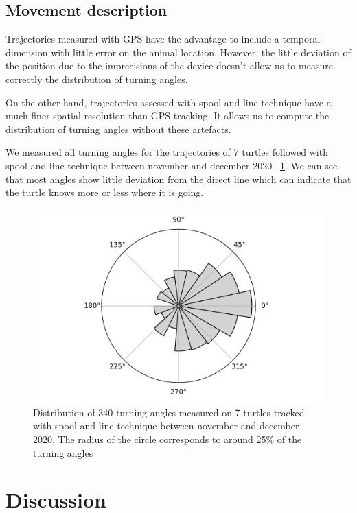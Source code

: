 \documentclass[10pt]{article}
\begin{document}
\subsection*{Movement description}

Trajectories measured with GPS have the advantage to include a temporal dimension with little error on the animal location. However, the little deviation of the position due to the imprecisions of the device doesn't allow us to measure correctly the distribution of turning angles.

On the other hand, trajectories assessed with spool and line technique have a much finer spatial resolution than GPS tracking. It allows us to compute the distribution of turning angles without these artefacts.

We measured all turning angles for the trajectories of 7 turtles followed with spool and line technique between november and december 2020 ~\ref{fig:angles}. We can see that most angles show little deviation from the direct line which can indicate that the turtle knows more or less where it is going.

\begin{figure}[!ht]
\centering
\includegraphics[width=0.9\columnwidth]{radial_histograms.png}
\caption{Distribution of 340 turning angles measured on 7 turtles tracked with spool and line technique between november and december 2020. The radius of the circle corresponds to around 25\% of the turning angles }
\label{fig:angles}
\end{figure}

\section*{Discussion}
\end{document}
